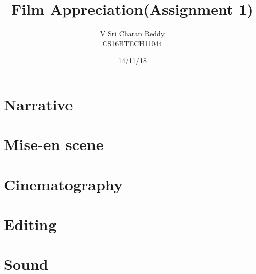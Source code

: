 \documentclass[10pt]{article}
\title{Film Appreciation(Assignment 1)}
\author{V Sri Charan Reddy\\CS16BTECH11044}
\date{14/11/18}
\begin{document}
		\onehalfspacing
	\maketitle
	\section{Narrative}
	\section{Mise-en scene}
	\section{Cinematography}
	\section{Editing}
	\section{Sound}
\end{document}

